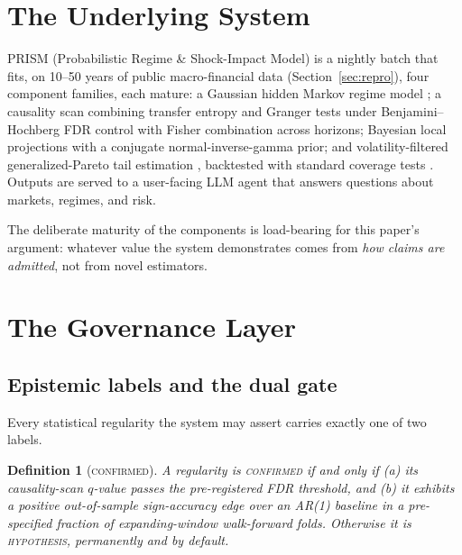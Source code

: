 \documentclass[11pt]{article}
\newtheorem{definition}{Definition}
\newcommand{\CONFIRMED}{\textsc{confirmed}}
\newcommand{\HYPOTHESIS}{\textsc{hypothesis}}
\begin{document}
\section{The Underlying System}\label{sec:system}

PRISM (Probabilistic Regime \& Shock-Impact Model) is a nightly batch
that fits, on 10--50 years of public macro-financial data
(Section~\ref{sec:repro}), four component families, each mature:
a Gaussian hidden Markov regime model \citep{hamilton1989new};
a causality scan combining transfer entropy
\citep{schreiber2000measuring, marschinski2002analysing} and Granger
tests under Benjamini--Hochberg FDR control
\citep{benjamini1995controlling} with Fisher combination
\citep{fisher1925statistical} across horizons; Bayesian local
projections \citep{jorda2005estimation, ferreira2023bayesian} with a
conjugate normal-inverse-gamma prior; and volatility-filtered
generalized-Pareto tail estimation \citep{mcneil2000estimation},
backtested with standard coverage tests \citep{kupiec1995techniques,
christoffersen1998evaluating}. Outputs are served to a user-facing LLM
agent that answers questions about markets, regimes, and risk.

The deliberate maturity of the components is load-bearing for this
paper's argument: whatever value the system demonstrates comes from
\emph{how claims are admitted}, not from novel estimators.

\section{The Governance Layer}\label{sec:governance}

\subsection{Epistemic labels and the dual gate}\label{sec:dualgate}

Every statistical regularity the system may assert carries exactly one
of two labels.

\begin{definition}[\CONFIRMED{}]
A regularity is \CONFIRMED{} if and only if (a) its causality-scan
$q$-value passes the pre-registered FDR threshold, \emph{and} (b) it
exhibits a positive out-of-sample sign-accuracy edge over an AR(1)
baseline in a pre-specified fraction of expanding-window walk-forward
folds. Otherwise it is \HYPOTHESIS{}, permanently and by default.
\end{definition}
\end{document}
